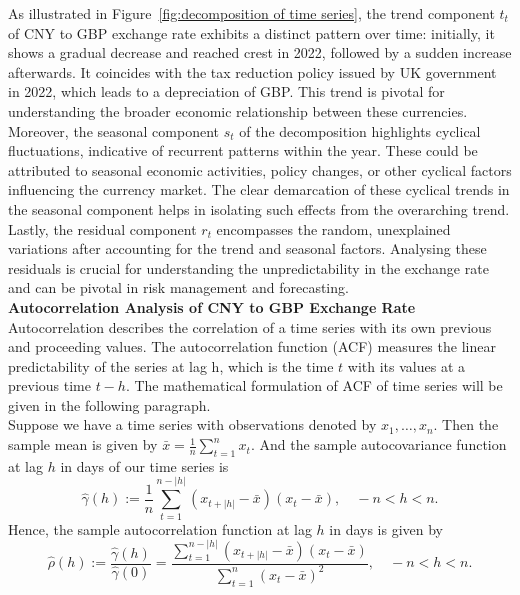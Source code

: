 \documentclass{article}\usepackage[]{graphicx}\usepackage[]{xcolor}
\numberwithin{equation}{section}
\begin{document}
\noindent
As illustrated in Figure~\ref{fig:decomposition of time series}, the trend component $t_t$ of CNY to GBP exchange rate exhibits a distinct pattern over time: initially, it shows a gradual decrease and reached crest in 2022, followed by a sudden increase afterwards. It coincides with the tax reduction policy issued by UK government in 2022, which leads to a depreciation of GBP. This trend is pivotal for understanding the broader economic relationship between these currencies. \\

\noindent
Moreover, the seasonal component $s_t$ of the decomposition highlights cyclical fluctuations, indicative of recurrent patterns within the year. These could be attributed to seasonal economic activities, policy changes, or other cyclical factors influencing the currency market. The clear demarcation of these cyclical trends in the seasonal component helps in isolating such effects from the overarching trend.\\

\noindent
Lastly, the residual component $r_t$ encompasses the random, unexplained variations after accounting for the trend and seasonal factors. Analysing these residuals is crucial for understanding the unpredictability in the exchange rate and can be pivotal in risk management and forecasting.\\

\noindent
\textbf{Autocorrelation Analysis of CNY to GBP Exchange Rate}\\
\noindent
Autocorrelation describes the correlation of a time series with its own previous and proceeding values. The autocorrelation function (ACF) measures the linear predictability of the series at lag h, which is the time $t$ with its values at a previous time $t-h$. The mathematical formulation of ACF of time series will be given in the following paragraph.\\

\noindent
Suppose we have a time series with observations denoted by \( x_1, \ldots, x_n \). Then the sample mean is given by $\bar{x} = \frac{1}{n} \sum_{t=1}^{n} x_t.$
And the sample autocovariance function \cite{Brockwell2016Introduction} at lag $h$ in days of our time series is
\[\hat{\gamma}(h) := \frac{1}{n} \sum_{t=1}^{n-|h|} (x_{t+|h|} - \bar{x})(x_t - \bar{x}), \quad -n < h < n.\]
Hence, the sample autocorrelation function \cite{Brockwell2016Introduction} at lag $h$ in days is given by
\[\hat{\rho}(h) := \frac{\hat{\gamma}(h)}{\hat{\gamma}(0)} = \frac{\sum_{t=1}^{n-|h|} (x_{t+|h|} - \bar{x})(x_t - \bar{x})}{\sum_{t=1}^{n} (x_t - \bar{x})^{2}}, \quad -n < h < n.\]
\end{document}
